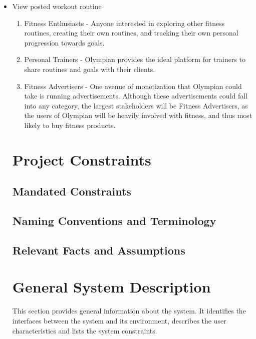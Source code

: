 \documentclass[12pt]{article}
\begin{document}
\begin{itemize}
	\item View posted workout routine 
	\begin{enumerate}
		\item Fitness Enthusiasts - Anyone interested in exploring other fitness
		routines, creating their own routines, and tracking their own personal
		progression towards goals.
		\item Personal Trainers - Olympian provides the ideal platform for trainers to
		share routines and goals with their clients.
		\item Fitness Advertisers - One avenue of monetization that Olympian could take
		is running advertisements. Although these advertisements could fall into any
		category, the largest stakeholders will be Fitness Advertisers,
		as the users of Olympian will be heavily involved with fitness, and thus most
		likely to buy fitness products.
	\end{enumerate} 
	
	\section{Project Constraints}
	\subsection{Mandated Constraints} 
	\subsection{Naming Conventions and Terminology}
	\subsection{Relevant Facts and Assumptions}
	
	\section{General System Description}
	
	This section provides general information about the system.  It identifies the
	interfaces between the system and its environment, describes the user
	characteristics and lists the system constraints.  
	
	

\end{itemize}
\end{document}

